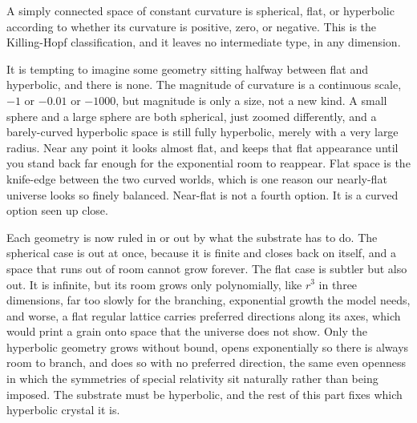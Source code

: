 \begin{theorem}
A simply connected space of constant curvature is spherical, flat, or hyperbolic according to whether its curvature is positive, zero, or negative. This is the Killing-Hopf classification, and it leaves no intermediate type, in any dimension.
\end{theorem}

It is tempting to imagine some geometry sitting halfway between flat and hyperbolic, and there is none. The magnitude of curvature is a continuous scale, $-1$ or $-0.01$ or $-1000$, but magnitude is only a size, not a new kind. A small sphere and a large sphere are both spherical, just zoomed differently, and a barely-curved hyperbolic space is still fully hyperbolic, merely with a very large radius. Near any point it looks almost flat, and keeps that flat appearance until you stand back far enough for the exponential room to reappear. Flat space is the knife-edge between the two curved worlds, which is one reason our nearly-flat universe looks so finely balanced. Near-flat is not a fourth option. It is a curved option seen up close.

Each geometry is now ruled in or out by what the substrate has to do. The spherical case is out at once, because it is finite and closes back on itself, and a space that runs out of room cannot grow forever. The flat case is subtler but also out. It is infinite, but its room grows only polynomially, like $r^3$ in three dimensions, far too slowly for the branching, exponential growth the model needs, and worse, a flat regular lattice carries preferred directions along its axes, which would print a grain onto space that the universe does not show. Only the hyperbolic geometry grows without bound, opens exponentially so there is always room to branch, and does so with no preferred direction, the same even openness in which the symmetries of special relativity sit naturally rather than being imposed. The substrate must be hyperbolic, and the rest of this part fixes which hyperbolic crystal it is.
